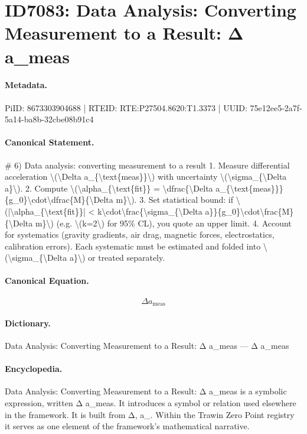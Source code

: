 \section*{ID7083: Data Analysis: Converting Measurement to a Result: Δ a\_meas}
\paragraph{Metadata.}
PiID: 8673303904688 | RTEID: RTE:P27504.8620:T1.3373 | UUID: 75e12ee5-2a7f-5a14-ba8b-32cbe08b91c4

\paragraph{Canonical Statement.}
\# 6) Data analysis: converting measurement to a result 1. Measure differential acceleration \textbackslash{}(\textbackslash{}Delta a\_\{\textbackslash{}text\{meas\}\}\textbackslash{}) with uncertainty \textbackslash{}(\textbackslash{}sigma\_\{\textbackslash{}Delta a\}\textbackslash{}). 2. Compute \textbackslash{}(\textbackslash{}alpha\_\{\textbackslash{}text\{fit\}\} = \textbackslash{}dfrac\{\textbackslash{}Delta a\_\{\textbackslash{}text\{meas\}\}\}\{g\_0\}\textbackslash{}cdot\textbackslash{}dfrac\{M\}\{\textbackslash{}Delta m\}\textbackslash{}). 3. Set statistical bound: if \textbackslash{}(|\textbackslash{}alpha\_\{\textbackslash{}text\{fit\}\}| < k\textbackslash{}cdot\textbackslash{}frac\{\textbackslash{}sigma\_\{\textbackslash{}Delta a\}\}\{g\_0\}\textbackslash{}cdot\textbackslash{}frac\{M\}\{\textbackslash{}Delta m\}\textbackslash{}) (e.g. \textbackslash{}(k=2\textbackslash{}) for 95\% CL), you quote an upper limit. 4. Account for systematics (gravity gradients, air drag, magnetic forces, electrostatics, calibration errors). Each systematic must be estimated and folded into \textbackslash{}(\textbackslash{}sigma\_\{\textbackslash{}Delta a\}\textbackslash{}) or treated separately.

\paragraph{Canonical Equation.}
\[
\Delta a_{\text{meas}}
\]

\paragraph{Dictionary.}
Data Analysis: Converting Measurement to a Result: Δ a\_meas — Δ a\_meas

\paragraph{Encyclopedia.}
Data Analysis: Converting Measurement to a Result: Δ a\_meas is a symbolic expression, written Δ a\_meas. It introduces a symbol or relation used elsewhere in the framework. It is built from Δ, a\_. Within the Trawin Zero Point registry it serves as one element of the framework's mathematical narrative.
